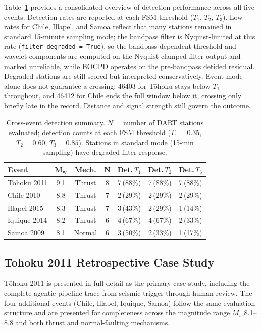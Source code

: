 \documentclass{article}
\begin{document}
Table~\ref{tab:cross-event-summary} provides a consolidated overview of
detection performance across all five events.  Detection rates are
reported at each FSM threshold ($T_1$, $T_2$, $T_3$).  Low rates for
Chile, Illapel, and Samoa reflect that many stations remained in
standard 15-minute sampling mode; the bandpass filter is Nyquist-limited
at this rate (\texttt{filter\_degraded = True}), so the
bandpass-dependent threshold and wavelet components are computed on the
Nyquist-clamped filter output and marked unreliable, while BOCPD
operates on the pre-bandpass detided residual. Degraded stations are
still scored but interpreted conservatively.
Event mode alone does not guarantee a crossing: 46403 for T\={o}hoku
stays below $T_1$ throughout, and 46412 for Chile ends the full window
below it, crossing only briefly late in the record. Distance and
signal strength still govern the outcome.

\begin{table}[!htbp]
\centering
\caption{Cross-event detection summary.  $N$ = number of DART stations
  evaluated; detection counts at each FSM threshold ($T_1{=}0.35$,
  $T_2{=}0.60$, $T_3{=}0.85$).  Stations in standard mode (15-min
  sampling) have degraded filter response.}
\label{tab:cross-event-summary}
\small
\begin{tabular}{lcccccc}
\toprule
\textbf{Event} & $\boldsymbol{M_w}$ & \textbf{Mech.}
  & $\boldsymbol{N}$ & \textbf{Det.\,$T_1$}
  & \textbf{Det.\,$T_2$} & \textbf{Det.\,$T_3$} \\
\midrule
T\={o}hoku 2011   & 9.1 & Thrust  & 8 & 7\,(88\%) & 7\,(88\%) & 7\,(88\%) \\
Chile 2010        & 8.8 & Thrust  & 7 & 2\,(29\%)  & 2\,(29\%) & 2\,(29\%) \\
Illapel 2015      & 8.3 & Thrust  & 7 & 3\,(43\%)  & 2\,(29\%) & 1\,(14\%) \\
Iquique 2014      & 8.2 & Thrust  & 6 & 4\,(67\%)  & 4\,(67\%) & 2\,(33\%) \\
Samoa 2009        & 8.1 & Normal  & 6 & 3\,(50\%)  & 2\,(33\%) & 1\,(17\%) \\
\bottomrule
\end{tabular}
\end{table}

\subsection{Tohoku 2011 Retrospective Case Study}
\label{sec:eval-tohoku}

T\={o}hoku 2011 is presented in full detail as the primary case study,
including the complete agentic pipeline trace from seismic trigger
through human review.  The four additional events
(Chile, Illapel, Iquique, Samoa) follow the same evaluation structure
and are presented for completeness across the magnitude range
$M_w$\,8.1--8.8 and both thrust and normal-faulting mechanisms.
\end{document}
